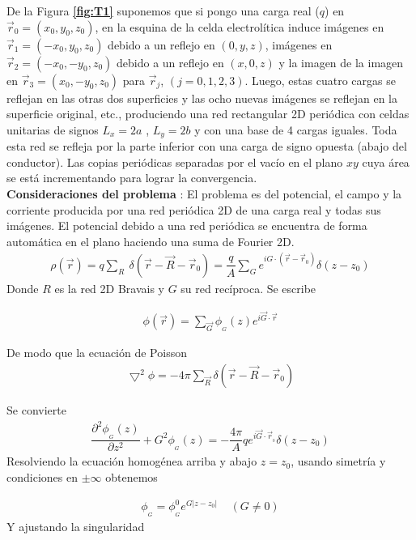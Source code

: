 \documentclass[a4paper,11pt,]{book}
\providecommand{\abs}[1]{\lvert#1\rvert}
\begin{document}
De la Figura \textbf{\ref{fig:T1}} suponemos que si pongo una carga real ($q$) en $\vec{r}_0= (x_0, y_0, z_0)$, en la esquina de la celda electrolítica induce imágenes en $\vec{r}_1= (-x_0, y_0, z_0)$ debido a un reflejo en $(0, y, z)$, imágenes en $\vec{r}_2= (-x_0, -y_0, z_0)$ debido a un reflejo en  $(x, 0, z)$ y la imagen de la imagen en $\vec{r}_3= (x_0, -y_0, z_0)$  para $\vec{r}_j$, $(j=0,1,2,3)$. Luego, estas cuatro cargas se reflejan en las otras dos superficies y las ocho nuevas imágenes se reflejan en la superficie original, etc., produciendo una red rectangular 2D periódica con celdas unitarias de signos  $L_x=2a$ , $L_y=2b$ y con una base de 4 cargas iguales. Toda esta red se refleja por la parte inferior con una carga de signo opuesta (abajo del conductor). Las copias periódicas separadas por el vacío en el plano $xy$ cuya área se está incrementando para lograr la convergencia. \\
\textbf{Consideraciones del problema }:  El problema es del potencial, el campo y la corriente producida por una red periódica 2D de una carga real y todas sus imágenes. El potencial debido a una red periódica se encuentra de forma automática en el plano haciendo una suma de Fourier 2D.  
\begin{eqnarray}
\rho(\vec{r}) =q \displaystyle\sum_{R}  \ \delta (\vec{r}-\vec{R}-\vec{r}_0) =\dfrac{q}{A}  \displaystyle\sum_{G}  e^{i G \cdot (\vec{r}-\vec{r}_{0})} \delta (z-z_0)
\end{eqnarray}
Donde ${R}$ es la red 2D Bravais y ${G}$ su red recíproca. Se escribe

\begin{eqnarray}
\phi(\vec{r}) = \displaystyle\sum_{\vec{G}} \phi_{_{G}} (z) e^{i \vec{G} \cdot \vec{r}}
\end{eqnarray}

De modo que la ecuación de Poisson
\begin{eqnarray}
\bigtriangledown^2 \phi=-4 \pi \displaystyle\sum_{\vec{R}} \delta (\vec{r}-\vec{R}-\vec{r}_0)
\end{eqnarray}

Se convierte
\begin{eqnarray}
\dfrac{\partial^2 \phi_{_{G}}(z)}{\partial z^2}+ G^2\phi_{_{G}}(z)= -\dfrac{4 \pi}{A}  q   e^{i \vec{G} \cdot \vec{r}_{_0}} \delta (z-z_0)
\end{eqnarray}
Resolviendo la ecuación homogénea arriba y abajo $ z = z_0 $, usando simetría y condiciones en $\pm \infty $ obtenemos

\begin{eqnarray}
\phi_{_{G}}= \phi_{_{G}}^{0}  e^{ G \abs{z-z_0}} \ \ \ \ \ (G\neq 0)
\end{eqnarray}
Y ajustando la singularidad
\end{document}
